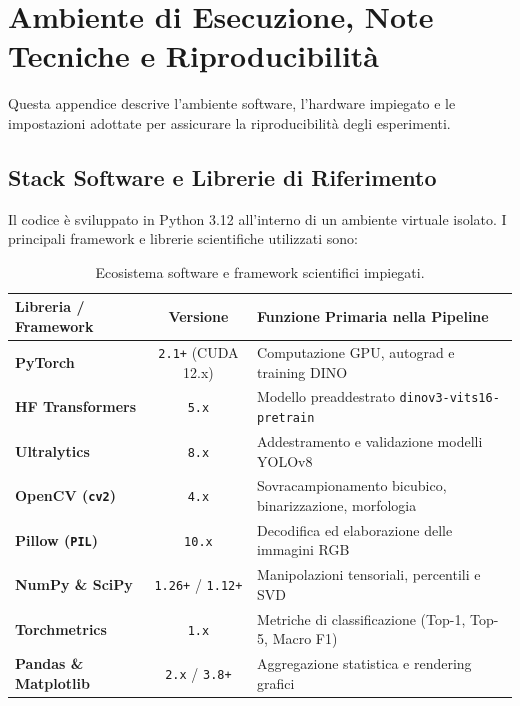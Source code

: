 \chapter{Ambiente di Esecuzione, Note Tecniche e Riproducibilità}
\label{chap:appendice_note_tecniche}

Questa appendice descrive l'ambiente software, l'hardware impiegato e le impostazioni adottate per assicurare la riproducibilità degli esperimenti.

\section{Stack Software e Librerie di Riferimento}
\label{sec:app_software}
Il codice è sviluppato in Python 3.12 all'interno di un ambiente virtuale isolato. I principali framework e librerie scientifiche utilizzati sono:

\begin{table}[htbp]
\centering
\small
\begin{tabularx}{\textwidth}{lcL}
\toprule
\textbf{Libreria / Framework} & \textbf{Versione} & \textbf{Funzione Primaria nella Pipeline} \\
\midrule
\textbf{PyTorch} & \texttt{2.1+} (CUDA 12.x) & Computazione GPU, autograd e training DINO \\
\textbf{HF Transformers} & \texttt{5.x} & Modello preaddestrato \texttt{dinov3-vits16-pretrain} \\
\textbf{Ultralytics} & \texttt{8.x} & Addestramento e validazione modelli YOLOv8 \\
\textbf{OpenCV (\texttt{cv2})} & \texttt{4.x} & Sovracampionamento bicubico, binarizzazione, morfologia \\
\textbf{Pillow (\texttt{PIL})} & \texttt{10.x} & Decodifica ed elaborazione delle immagini RGB \\
\textbf{NumPy \& SciPy} & \texttt{1.26+} / \texttt{1.12+} & Manipolazioni tensoriali, percentili e SVD \\
\textbf{Torchmetrics} & \texttt{1.x} & Metriche di classificazione (Top-1, Top-5, Macro F1) \\
\textbf{Pandas \& Matplotlib} & \texttt{2.x} / \texttt{3.8+} & Aggregazione statistica e rendering grafici \\
\bottomrule
\end{tabularx}
\caption{Ecosistema software e framework scientifici impiegati.}
\label{tab:app_software}
\end{table}

